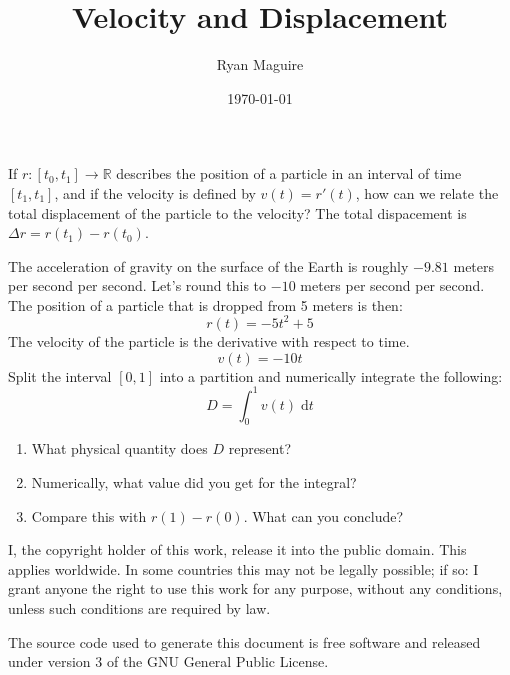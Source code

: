 \documentclass{article}
\title{Velocity and Displacement}
\author{Ryan Maguire}
\date{\today}
\begin{document}
    \maketitle
    If $r:[t_{0},t_{1}]\rightarrow\mathbb{R}$ describes the position of a
    particle in an interval of time $[t_{1},t_{1}]$, and if the velocity is
    defined by $v(t)=r'(t)$, how can we relate the total displacement of the
    particle to the velocity? The total dispacement is
    $\Delta{r}=r(t_{1})-r(t_{0})$.
    \par\hfill\par
    The acceleration of gravity on the surface of the Earth is roughly
    $-9.81$ meters per second per second. Let's round this to $-10$ meters per
    second per second. The position of a particle that is dropped from 5
    meters is then:
    \begin{equation}
        r(t)=-5t^{2}+5
    \end{equation}
    The velocity of the particle is the derivative with respect to time.
    \begin{equation}
        v(t)=-10t
    \end{equation}
    Split the interval $[0,1]$ into a partition and numerically integrate
    the following:
    \begin{equation}
        D=\int_{0}^{1}v(t)\;\textrm{d}t
    \end{equation}
    \begin{enumerate}
        \item
        What physical quantity does $D$ represent?
        \item
        Numerically, what value did you get for the integral?
        \item
        Compare this with $r(1)-r(0)$. What can you conclude?
    \end{enumerate}
    \newpage
    I, the copyright holder of this work, release it into the public domain.
    This applies worldwide. In some countries this may not be legally possible;
    if so: I grant anyone the right to use this work for any purpose, without
    any conditions, unless such conditions are required by law.
    \par\hfill\par
    The source code used to generate this document is free software and released
    under version 3 of the GNU General Public License.
\end{document}
